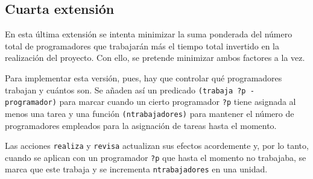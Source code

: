 
\subsection{Cuarta extensión} \label{sec:mod-ext4}

En esta última extensión se intenta minimizar la suma ponderada del número 
total de programadores que trabajarán más el tiempo total invertido en la 
realización del proyecto. Con ello, se pretende minimizar ambos factores a la 
vez.

Para implementar esta versión, pues, hay que controlar qué programadores 
trabajan y cuántos son. Se añaden así un predicado 
\texttt{(trabaja ?p - programador)} para marcar cuando un cierto programador 
\texttt{?p} tiene asignada al menos una tarea y una función 
\texttt{(ntrabajadores)} para mantener el número de programadores empleados 
para la asignación de tareas hasta el momento. 

Las acciones \texttt{realiza} y \texttt{revisa} actualizan sus efectos 
acordemente y, por lo tanto, cuando se aplican con un programador \texttt{?p} 
que hasta el momento no trabajaba, se marca que este trabaja y se incrementa 
\texttt{ntrabajadores} en una unidad.




